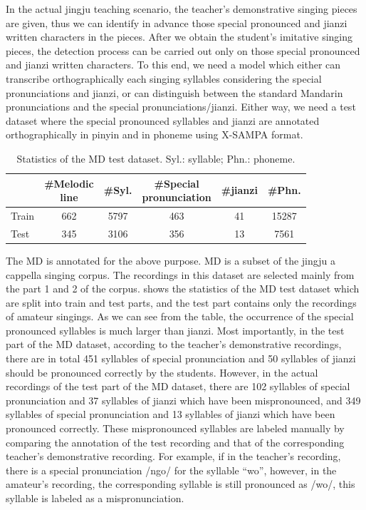 In the actual jingju teaching scenario, the teacher's demonstrative singing pieces are given, thus we can identify in advance those special pronounced and \gls{jianzi} written characters in the pieces. After we obtain the student's imitative singing pieces, the detection process can be carried out only on those special pronounced and \gls{jianzi} written characters. To this end, we need a model which either can transcribe orthographically each singing syllables considering the special pronunciations and \gls{jianzi}, or can distinguish between the standard Mandarin pronunciations and the special pronunciations/\gls{jianzi}. Either way, we need a test dataset where the special pronounced syllables and \gls{jianzi} are annotated orthographically in pinyin and in phoneme using \gls{X-SAMPA} format.

\begin{table}[ht]
    \centering
    \caption{Statistics of the MD test dataset. Syl.: syllable; Phn.: phoneme.}
    \label{table:ch4:detailInfoDataset_md}
    \begin{tabular}{l|ccccc}
        \toprule
        & \makecell{\#Melodic\\line} & \#Syl. & \makecell{\#Special\\pronunciation} & \#jianzi & \#Phn. \\
        \midrule
        Train           & 662 & 5797 & 463 & 41 & 15287 \\
        Test               & 345 & 3106 & 356 & 13 & 7561 \\
        \bottomrule
    \end{tabular}
\end{table}

The \gls{MD} is annotated for the above purpose. \gls{MD} is a subset of the jingju a cappella singing corpus. The recordings in this dataset are selected mainly from the part 1 and 2 of the corpus.  shows the statistics of the \gls{MD} test dataset which are split into train and test parts, and the test part contains only the recordings of amateur singings. As we can see from the table, the occurrence of the special pronounced syllables is much larger than \gls{jianzi}. Most importantly, in the test part of the \gls{MD} dataset, according to the teacher's demonstrative recordings, there are in total 451 syllables of special pronunciation and 50 syllables of \gls{jianzi} should be pronounced correctly by the students. However, in the actual recordings of the test part of the \gls{MD} dataset, there are 102 syllables of special pronunciation and 37 syllables of \gls{jianzi} which have been mispronounced, and 349 syllables of special pronunciation and 13 syllables of \gls{jianzi} which have been pronounced correctly. These mispronounced syllables are labeled manually by comparing the annotation of the test recording and that of the corresponding teacher's demonstrative recording. For example, if in the teacher's recording, there is a special pronunciation /ngo/ for the syllable ``wo”, however, in the amateur's recording, the corresponding syllable is still pronounced as /wo/, this syllable is labeled as a mispronunciation.


